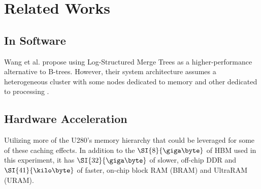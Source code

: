 \section{Related Works}

\subsection{In Software}

Wang et al. propose using Log-Structured Merge Trees as a higher-performance alternative to B-trees. However, their system architecture assumes a heterogeneous cluster with some nodes dedicated to memory and other dedicated to processing \cite{dlsm}.


\subsection{Hardware Acceleration}

Utilizing more of the U280's memory hierarchy that could be leveraged for some of these caching effects. In addition to the $\SI{8}{\giga\byte}$ of HBM used in this experiment, it has $\SI{32}{\giga\byte}$ of slower, off-chip DDR and $\SI{41}{\kilo\byte}$ of faster, on-chip block RAM (BRAM) and UltraRAM (URAM).
